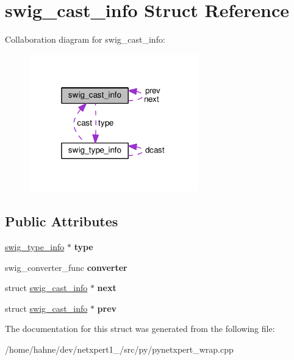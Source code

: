 \hypertarget{structswig__cast__info}{}\section{swig\+\_\+cast\+\_\+info Struct Reference}
\label{structswig__cast__info}


Collaboration diagram for swig\+\_\+cast\+\_\+info\+:\nopagebreak
\begin{figure}[H]
\begin{center}
\leavevmode
\includegraphics[width=208pt]{structswig__cast__info__coll__graph}
\end{center}
\end{figure}
\subsection*{Public Attributes}
\begin{DoxyCompactItemize}
\item 
\hyperlink{structswig__type__info}{swig\+\_\+type\+\_\+info} $\ast$ {\bfseries type}\hypertarget{structswig__cast__info_a1c9023a301c8d6806209f4e10df6e9e0}{}\label{structswig__cast__info_a1c9023a301c8d6806209f4e10df6e9e0}

\item 
swig\+\_\+converter\+\_\+func {\bfseries converter}\hypertarget{structswig__cast__info_aa630fddfbb1bf9c97a03f9479ba32f76}{}\label{structswig__cast__info_aa630fddfbb1bf9c97a03f9479ba32f76}

\item 
struct \hyperlink{structswig__cast__info}{swig\+\_\+cast\+\_\+info} $\ast$ {\bfseries next}\hypertarget{structswig__cast__info_ae79c6fa058a9d908bbdac14db0c9db5e}{}\label{structswig__cast__info_ae79c6fa058a9d908bbdac14db0c9db5e}

\item 
struct \hyperlink{structswig__cast__info}{swig\+\_\+cast\+\_\+info} $\ast$ {\bfseries prev}\hypertarget{structswig__cast__info_afc685bcf38a5a06c6601775138c5999c}{}\label{structswig__cast__info_afc685bcf38a5a06c6601775138c5999c}

\end{DoxyCompactItemize}


The documentation for this struct was generated from the following file\+:\begin{DoxyCompactItemize}
\item 
/home/hahne/dev/netxpert1\+\_/src/py/pynetxpert\+\_\+wrap.\+cpp\end{DoxyCompactItemize}
